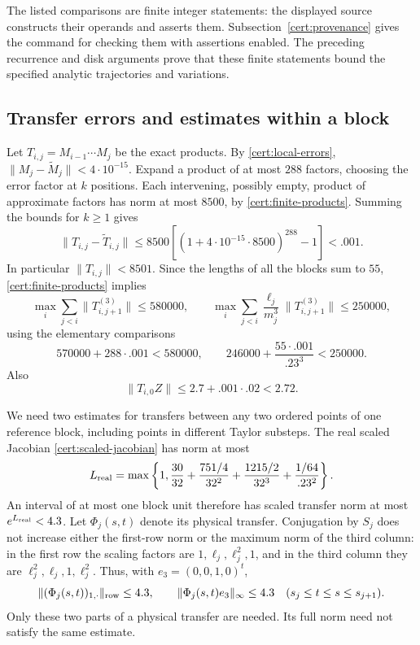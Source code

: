 The listed comparisons are finite integer statements: the displayed source
constructs their operands and asserts them.  Subsection~\ref{cert:provenance} gives the command for checking them
with assertions enabled.
The preceding recurrence and disk arguments prove that these finite
statements bound the specified analytic trajectories and variations.

\subsection{Transfer errors and estimates within a block}
\label{cert:transfer-errors}

Let \(T_{i,j}=M_{i-1}\cdots M_j\) be the exact products.
By \eqref{cert:local-errors},
\(\|M_j-\widetilde M_j\|<4\cdot10^{-15}\).
Expand a product of at most \(288\) factors, choosing the error factor at
\(k\) positions.  Each intervening, possibly empty, product of approximate
factors has norm at most \(8500\), by \eqref{cert:finite-products}.
Summing the bounds for \(k\ge1\) gives
\begin{equation}\label{cert:product-perturbation}
 \|T_{i,j}-\widetilde T_{i,j}\|
 \le8500\left[(1+4\cdot10^{-15}\cdot8500)^{288}-1\right]
 <.001.
\end{equation}
In particular \(\|T_{i,j}\|<8501\).  Since the lengths of all the
blocks sum to \(55\), \eqref{cert:finite-products} implies
\begin{equation}\label{cert:exact-sums}
 \max_i\sum_{j<i}\|T_{i,j+1}^{(3)}\|\le580000,\qquad
 \max_i\sum_{j<i}\frac{\ell_j}{m_j^3}
             \|T_{i,j+1}^{(3)}\|\le250000,
\end{equation}
using the elementary comparisons
\[
 570000+288\cdot.001<580000,\qquad
 246000+\frac{55\cdot.001}{.23^3}<250000.
\]
Also
\begin{equation}\label{cert:linear-size}
 \|T_{i,0}Z\|\le2.7+.001\cdot.02<2.72.
\end{equation}

We need two estimates for transfers between any two ordered points of
one reference block, including points in different Taylor substeps.
The real scaled Jacobian \eqref{cert:scaled-jacobian} has norm at most
\[
 L_{\rm real}=
 \max\left\{1,\frac{30}{32}+\frac{751/4}{32^2}
                  +\frac{1215/2}{32^3}
                  +\frac{1/64}{.23^2}\right\}.
\]
An interval of at most one block unit therefore has scaled transfer norm
at most \(e^{L_{\rm real}}<4.3\).
Let \(\Phi_j(s,t)\) denote its physical transfer.
Conjugation by \(S_j\) does not increase either the first-row norm or the
maximum norm of the third column: in the first row the scaling factors
are \(1,\ell_j,\ell_j^2,1\), and in the third column they are
\(\ell_j^2,\ell_j,1,\ell_j^2\).
Thus, with \(e_3=(0,0,1,0)^t\),
\begin{equation}\label{cert:partial-transfer}
 \|(\Phi_j(s,t))_{1,\cdot}\|_{\rm row}\le4.3,\qquad
 \|\Phi_j(s,t)e_3\|_\infty\le4.3
 \quad(s_j\le t\le s\le s_{j+1}).
\end{equation}
Only these two parts of a physical transfer are needed.  Its full norm
need not satisfy the same estimate.

